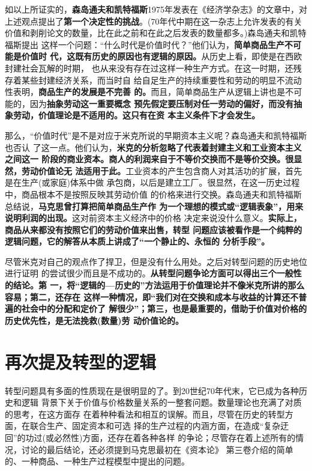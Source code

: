 如以上所证实的，\textbf{森岛通夫和凯特福斯}1975年发表在《经济学杂志》的文章中，对
上述观点提出了\textbf{第一个决定性的挑战}。(70年代中期在这一杂志上允许发表的有关
价值和剥削论文的数量，比在此之前和在此之后发表的数量都多。)森岛通夫和凯特福斯提出
这样一个问题：“什么时代是价值时代？”他们认为，\textbf{简单商品生产不可能是价值时
  代，这既有历史的原因也有逻辑的原因。}从历史上看，即使是在西欧封建社会瓦解的时期，
也从来没有存在过这样一种生产方式。在这一时期，还残存着某些封建经济关系，而当时自
给自足生产的持续重要性和劳动的明显不流动性表明，\textbf{商品生产的发展是不完善
  的。}而且，简单商品生产从逻辑上讲也是不可能的，因为\textbf{抽象劳动这一重要概念
  预先假定要压制对任一劳动的偏好，而没有抽象劳动，价值理论是不适用的。这只有在资
  本主义条件下才会发生。}

那么，“价值时代”是不是对应于米克所说的早期资本主义呢？森岛通夫和凯特福斯也否认
了这一点。他们认为，\textbf{米克的分析忽略了代表着封建主义和工业资本主义之间这一
  阶段的商业资本。商人的利润来自于不等价交换而不是等价交换。很显然，劳动价值论无
  法适用于此。}工业资本的产生包含商人对其活功的扩展，首先是在生产(或家庭)体系中做
承包商，以后是建立工厂。很显然，在这一历史过程中，商品根本不是按照反映其劳动价值
的价格来进行交换。森岛通夫和凯特福斯总结说，\textbf{马克思曾打算把简单商品生产作
  为一个理想的模式或“逻辑表象”，用来说明利润的出现。}这对前资本主义经济中的价格
决定来说没什么意义。\textbf{实际上，商品从来都没有按照它们的劳动价值来出售，转型
  问题应该被看作是一个纯粹的逻辑问题，它的解答从本质上讲成了“一个静止的、永恒的
  分析手段”。}

尽管米克对自己的观点作了捍卫，但是没有什么用处。之后对转型问题的历史地位进行证明
的尝试很少而且是不成功的。\textbf{从转型问题争论方面可以得出三个一般性的结论。第
  一，将“逻辑的—历史的”方法运用于价值理论并不像米克所讲的那么容易；第二，还存在
  这样一种情况，即“我们对在交换和成本与收益的计算还不普遍的社会中的分配和定价了
  解很少”；第三，也是最重要的，借助于价值对价格的历史优先性，是无法挽救(数量)劳
  动价值论的。}

\section{再次提及转型的逻辑}

转型问题具有多面的性质现在是很明显的了。到20世纪70年代末，它已成为各种历史和逻辑
背景下关于价值与价格数量关系的一整套问题。数量理论也充满了对质的思考，在这方面存
在着种种看法和相互的误解。而且，尽管在历史的转型方面，在联合生产、固定资本和可选
择的生产过程的内涵方面，在造成“复杂迂回”的功过(或必然性)方面，还存在着各种各样
的争论；尽管存在着上述所有的情况，讨论的最后结论，还必须提到马克思最初在《资本论》
第三卷介绍的简单的、一种商品、一种生产过程模型中提出的问题。

